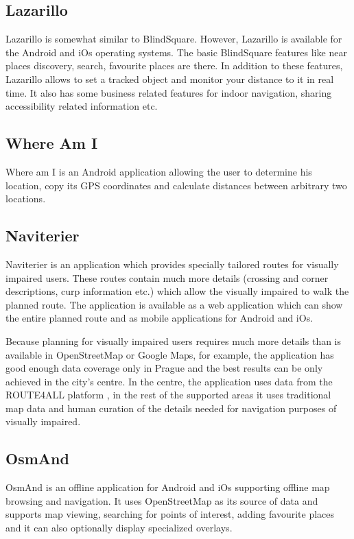 \documentclass[nolof,digital]{fithesis3}
\begin{document}
\subsection{Lazarillo}
Lazarillo \parencite{lazarillo} is somewhat similar to BlindSquare. However, Lazarillo is available for the Android and iOs operating systems. The basic BlindSquare features like near places discovery, search, favourite places are there. In addition to these features, Lazarillo allows to set a tracked object and monitor your distance to it in real time. It also has some business related features for indoor navigation, sharing accessibility related information etc.
\subsection{Where Am I}
Where am I \parencite{whereami} is an Android application allowing the user to determine his location, copy its GPS coordinates and calculate distances between arbitrary two locations.
\subsection{Naviterier}
Naviterier \parencite{naviterier} is an application which provides specially tailored routes for visually impaired users. These routes contain much more details (crossing and corner descriptions, curp information etc.) which allow the visually impaired to walk the planned route. The application is available as a web application which can show the entire planned route and as mobile applications for Android and iOs.

Because planning for visually impaired users requires much more details than is available in OpenStreetMap or Google Maps, for example, the application has good enough data coverage only in Prague and the best results can be only achieved in the city's centre. In the centre, the application uses data from the ROUTE4ALL platform \parencite{route4all}, in the rest of the supported areas it uses traditional map data and human curation of the details needed for navigation purposes of visually impaired.
\subsection{OsmAnd}
OsmAnd \parencite{osmand} is an offline application for Android and iOs supporting offline map browsing and navigation. It uses OpenStreetMap as its source of data and supports map viewing, searching for points of interest, adding favourite places and it can also optionally display specialized overlays.
\end{document}
